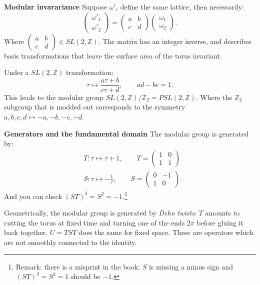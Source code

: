\documentclass[submission, PhysLectNotes]{SciPost}
\begin{document}
{\bf Modular invarariance}
Suppose $\omega'_i$ define the same lattice, then necessarily:
\begin{equation}
\begin{pmatrix}
	\omega'_1\\
	\omega'_2
\end{pmatrix}
=
\begin{pmatrix}
	a & b\\
	c & d
\end{pmatrix}
\begin{pmatrix}
	\omega_1\\
	\omega_2
\end{pmatrix}.
\end{equation}
Where $\begin{pmatrix}
	a & b\\
	c & d
\end{pmatrix}\in SL(2,\mathbb{Z})$. The matrix has an integer inverse, and describes basis transformations that leave the surface area of the torus invariant.

Under a $SL(2,\mathbb{Z})$ transformation:
\begin{equation}
	\tau\mapsto\frac{a\tau + b}{c\tau +d},\qquad ad-bc=1.
\end{equation}
This leads to the modular group $SL(2,\mathbb{Z})/\mathbb{Z}_2=PSL(2,\mathbb{Z})$. Where the $\mathbb{Z}_2$ subgroup that is modded out corresponds to the symmetry $a,b,c,d\mapsto-a,-b,-c,-d$.


{\bf Generators and the fundamental domain}
The modular group is generated by:
\begin{align}
	&T:\tau\mapsto\tau +1,\qquad
	T =
	\begin{pmatrix}
		1 & 0\\
		1 & 1
	\end{pmatrix}\\
	&S:\tau\mapsto-\frac{1}{\tau},\qquad
	S =
	\begin{pmatrix}
		0 & -1\\
		1 & 0
	\end{pmatrix}.
\end{align}
And you can check ${(ST)}^3=S^2=-1$.\footnote{{\color{red}Remark:} there is a misprint in the book: $S$ is missing a minus sign and ${(ST)}^3=S^2=1$ should be $-1$.}

Geometrically, the modular group is generated by \emph{Dehn twists}: $T$ amounts to cutting the torus at fixed time and turning one of the ends $2\pi$ before gluing it back together. $U=TST$ does the same for fixed space. These are operators which are not smoothly connected to the identity.
\end{document}
